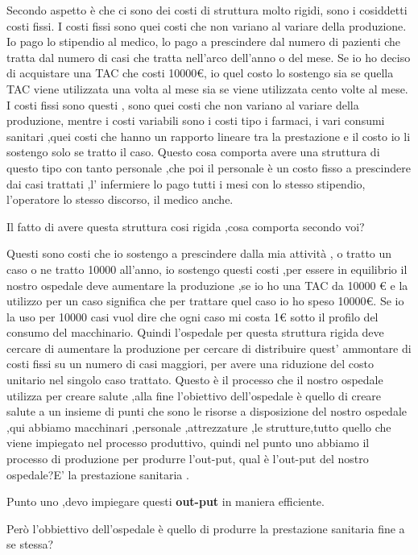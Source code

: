 \documentclass[]{article}
\newcommand{\euro}{€}
\begin{document}
Secondo aspetto è che ci sono dei costi di struttura molto rigidi, sono
i cosiddetti costi fissi. I costi fissi sono quei costi che non variano
al variare della produzione. Io pago lo stipendio al medico, lo pago a
prescindere dal numero di pazienti che tratta dal numero di casi che
tratta nell'arco dell'anno o del mese. Se io ho deciso di acquistare una
TAC che costi 10000\euro{}, io quel costo lo sostengo sia se quella TAC
viene utilizzata una volta al mese sia se viene utilizzata cento volte
al mese. I costi fissi sono questi , sono quei costi che non variano al
variare della produzione, mentre i costi variabili sono i costi tipo i
farmaci, i vari consumi sanitari ,quei costi che hanno un rapporto
lineare tra la prestazione e il costo io li sostengo solo se tratto il
caso. Questo cosa comporta avere una struttura di questo tipo con tanto
personale ,che poi il personale è un costo fisso a prescindere dai casi
trattati ,l' infermiere lo pago tutti i mesi con lo stesso stipendio,
l'operatore lo stesso discorso, il medico anche.

Il fatto di avere questa struttura cosi rigida ,cosa comporta secondo
voi?

Questi sono costi che io sostengo a prescindere dalla mia attività , o
tratto un caso o ne tratto 10000 all'anno, io sostengo questi costi ,per
essere in equilibrio il nostro ospedale deve aumentare la produzione ,se
io ho una TAC da 10000 \euro{} e la utilizzo per un caso significa che
per trattare quel caso io ho speso 10000\euro{}. Se io la uso per 10000
casi vuol dire che ogni caso mi costa 1\euro{} sotto il profilo del
consumo del macchinario. Quindi l'ospedale per questa struttura rigida
deve cercare di aumentare la produzione per cercare di distribuire
quest' ammontare di costi fissi su un numero di casi maggiori, per avere
una riduzione del costo unitario nel singolo caso trattato. Questo è il
processo che il nostro ospedale utilizza per creare salute ,alla fine
l'obiettivo dell'ospedale è quello di creare salute a un insieme di
punti che sono le risorse a disposizione del nostro ospedale ,qui
abbiamo macchinari ,personale ,attrezzature ,le strutture,tutto quello
che viene impiegato nel processo produttivo, quindi nel punto uno
abbiamo il processo di produzione per produrre l'out-put, qual è
l'out-put del nostro ospedale?E' la prestazione sanitaria .

Punto uno ,devo impiegare questi \textbf{out-put} in maniera efficiente.

Però l'obbiettivo dell'ospedale è quello di produrre la prestazione
sanitaria fine a se stessa?
\end{document}
